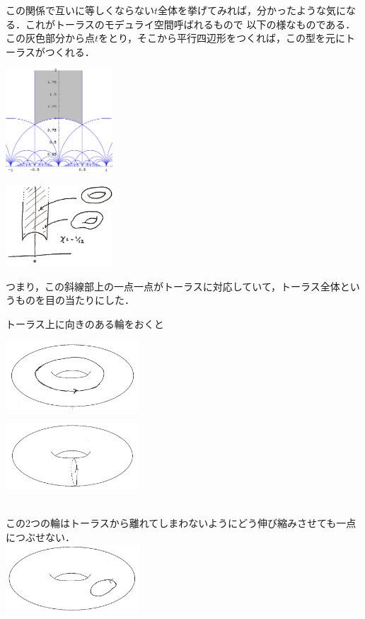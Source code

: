 この関係で互いに等しくならない$t$全体を挙げてみれば，分かったような気になる．これがトーラスのモデュライ空間呼ばれるもので
以下の様なものである．この灰色部分から点$t$をとり，そこから平行四辺形をつくれば，この型を元にトーラスがつくれる．

\begin{minipage}{0.5\hsize}
\includegraphics[width=4cm]{asaka8.png}
\end{minipage}
\begin{minipage}{0.5\hsize}
\includegraphics[width=4cm]{asaka9.jpg}
\end{minipage}

つまり，この斜線部上の一点一点がトーラスに対応していて，トーラス全体というものを目の当たりにした．

トーラス上に向きのある輪をおくと
\\
\begin{minipage}{0.5\hsize}
\includegraphics[width=5cm]{asaka10.png}
\end{minipage}
\begin{minipage}{0.5\hsize}
\includegraphics[width=5cm]{asaka101.png}
\end{minipage}
\\
この2つの輪はトーラスから離れてしまわないようにどう伸び縮みさせても一点につぶせない．\\
\includegraphics[width=5cm]{asaka11.png}

